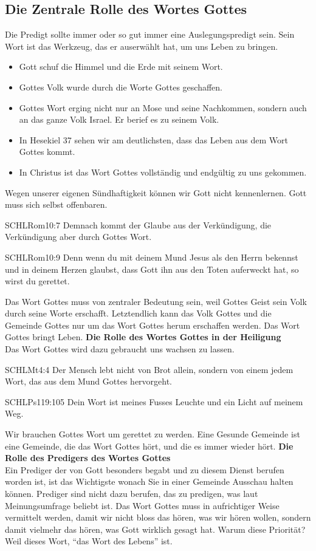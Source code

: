 \documentclass{../../inc/mybib}
\begin{document}
\subsection{Die Zentrale Rolle des Wortes Gottes}
Die Predigt sollte immer oder so gut immer eine Auslegungspredigt sein. Sein Wort ist das Werkzeug, das er auserwählt hat, um uns Leben zu bringen.
\begin{itemize}
    \item Gott schuf die Himmel und die Erde mit seinem Wort.
    \item Gottes Volk wurde durch die Worte Gottes geschaffen.
    \item Gottes Wort erging nicht nur an Mose und seine Nachkommen, sondern auch an das ganze Volk Israel. Er berief es zu seinem Volk.
    \item In Hesekiel 37 sehen wir am deutlichsten, dass das Leben aus dem Wort Gottes kommt.
    \item In Christus ist das Wort Gottes vollständig und endgültig zu uns gekommen.
\end{itemize}
Wegen unserer eigenen Sündhaftigkeit können wir Gott nicht kennenlernen. Gott muss sich selbst offenbaren.
\begin{bibelbox}{SCHL}{Rom}{10:7}
    Demnach kommt der Glaube aus der Verkündigung, die Verkündigung aber durch Gottes Wort.
\end{bibelbox}
\begin{bibelbox}{SCHL}{Rom}{10:9}
    Denn wenn du mit deinem Mund Jesus als den Herrn bekennst und in deinem Herzen glaubst, dass Gott ihn aus den Toten auferweckt hat, so wirst du gerettet.
\end{bibelbox}
Das Wort Gottes muss von zentraler Bedeutung sein, weil Gottes Geist sein Volk durch seine Worte erschafft. Letztendlich kann das Volk Gottes und die Gemeinde Gottes nur um das Wort Gottes herum erschaffen werden. Das Wort Gottes bringt Leben.
\textbf{Die Rolle des Wortes Gottes in der Heiligung}\\
Das Wort Gottes wird dazu gebraucht uns wachsen zu lassen.
\begin{bibelbox}{SCHL}{Mt}{4:4}
    Der Mensch lebt nicht von Brot allein, sondern von einem jedem Wort, das aus dem Mund Gottes hervorgeht.
\end{bibelbox}
\begin{bibelbox}{SCHL}{Ps}{119:105}
    Dein Wort ist meines Fusses Leuchte und ein Licht auf meinem Weg.
\end{bibelbox}
Wir brauchen Gottes Wort um gerettet zu werden. Eine Gesunde Gemeinde ist eine Gemeinde, die das Wort Gottes hört, und die es immer wieder hört.
\textbf{Die Rolle des Predigers des Wortes Gottes}\\
Ein Prediger der von Gott besonders begabt und zu diesem Dienst berufen worden ist, ist das Wichtigste wonach Sie in einer Gemeinde Ausschau halten können. Prediger sind nicht dazu berufen, das zu predigen, was laut Meinungsumfrage beliebt ist. Das Wort Gottes muss in aufrichtiger Weise vermittelt werden, damit wir nicht bloss das hören, was wir hören wollen, sondern damit vielmehr das hören, was Gott wirklich gesagt hat. Warum diese Priorität? Weil dieses Wort, \enquote{das Wort des Lebens} ist.
\end{document}

